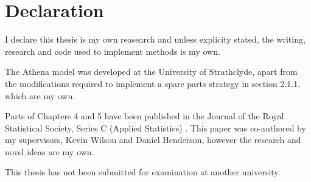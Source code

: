 \section*{Declaration}
I declare this thesis is my own reasearch and unless explicity stated, the writing, research and code used to implement methods is my own.

The Athena model was developed at the University of Strathclyde, apart from the modifications required to implement a spare parts strategy in section 2.1.1, which are my own.

Parts of Chapters 4 and 5 have been published in the Journal of the Royal Statistical Society, Series C (Applied Statistics) \citet{Kennedy2023}. This paper was co-authored by my supervisors, Kevin Wilson and Daniel Henderson, however the research and novel ideas are my own.

This thesis has not been submitted for examination at another university.

